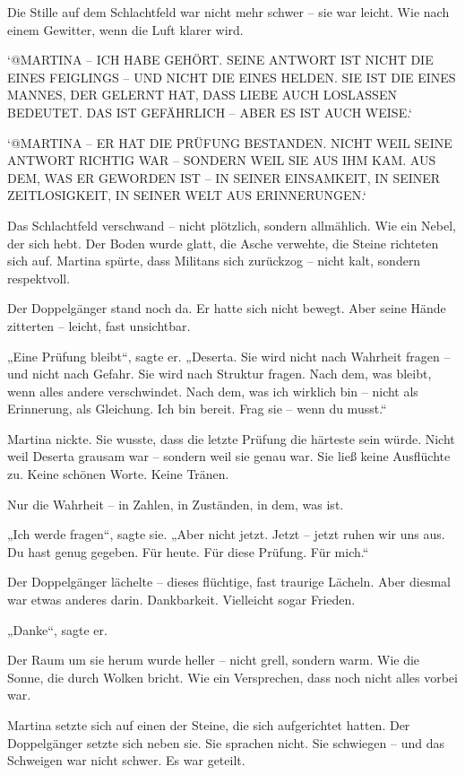 \documentclass[
]{article}
\begin{document}
Die Stille auf dem Schlachtfeld war nicht mehr schwer -- sie war leicht. Wie nach einem Gewitter, wenn die Luft klarer wird.

`@MARTINA -- ICH HABE GEHÖRT. SEINE ANTWORT IST NICHT DIE EINES FEIGLINGS -- UND NICHT DIE EINES HELDEN. SIE IST DIE EINES MANNES, DER GELERNT HAT, DASS LIEBE AUCH LOSLASSEN BEDEUTET. DAS IST GEFÄHRLICH -- ABER ES IST AUCH WEISE.`

`@MARTINA -- ER HAT DIE PRÜFUNG BESTANDEN. NICHT WEIL SEINE ANTWORT RICHTIG WAR -- SONDERN WEIL SIE AUS IHM KAM. AUS DEM, WAS ER GEWORDEN IST -- IN SEINER EINSAMKEIT, IN SEINER ZEITLOSIGKEIT, IN SEINER WELT AUS ERINNERUNGEN.`

Das Schlachtfeld verschwand -- nicht plötzlich, sondern allmählich. Wie ein Nebel, der sich hebt. Der Boden wurde glatt, die Asche verwehte, die Steine richteten sich auf. Martina spürte, dass Militans sich zurückzog -- nicht kalt, sondern respektvoll.

Der Doppelgänger stand noch da. Er hatte sich nicht bewegt. Aber seine Hände zitterten -- leicht, fast unsichtbar.

„Eine Prüfung bleibt``, sagte er. „Deserta. Sie wird nicht nach Wahrheit fragen -- und nicht nach Gefahr. Sie wird nach Struktur fragen. Nach dem, was bleibt, wenn alles andere verschwindet. Nach dem, was ich wirklich bin -- nicht als Erinnerung, als Gleichung. Ich bin bereit. Frag sie -- wenn du musst.``

Martina nickte. Sie wusste, dass die letzte Prüfung die härteste sein würde. Nicht weil Deserta grausam war -- sondern weil sie genau war. Sie ließ keine Ausflüchte zu. Keine schönen Worte. Keine Tränen.

Nur die Wahrheit -- in Zahlen, in Zuständen, in dem, was ist.

„Ich werde fragen``, sagte sie. „Aber nicht jetzt. Jetzt -- jetzt ruhen wir uns aus. Du hast genug gegeben. Für heute. Für diese Prüfung. Für mich.``

Der Doppelgänger lächelte -- dieses flüchtige, fast traurige Lächeln. Aber diesmal war etwas anderes darin. Dankbarkeit. Vielleicht sogar Frieden.

„Danke``, sagte er.

Der Raum um sie herum wurde heller -- nicht grell, sondern warm. Wie die Sonne, die durch Wolken bricht. Wie ein Versprechen, dass noch nicht alles vorbei war.

Martina setzte sich auf einen der Steine, die sich aufgerichtet hatten. Der Doppelgänger setzte sich neben sie. Sie sprachen nicht. Sie schwiegen -- und das Schweigen war nicht schwer. Es war geteilt.
\end{document}

